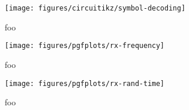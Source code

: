 \begin{figure}[htb]
	\centering
	\texttt{[image: figures/circuitikz/symbol-decoding]}
	\caption{foo}
\end{figure}

\begin{figure}[htb]
	\centering
	\texttt{[image: figures/pgfplots/rx-frequency]}
	\caption{foo}
\end{figure}

\begin{figure}[htb]
	\centering
	\texttt{[image: figures/pgfplots/rx-rand-time]}
	\caption{foo}
\end{figure}